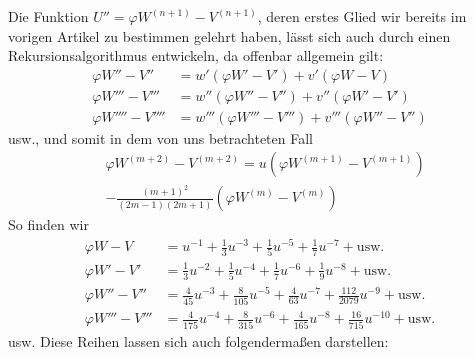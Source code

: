 Die Funktion $U''=\varphi W^{(n+1)}-V^{(n+1)}$, deren erstes Glied wir bereits im vorigen Artikel zu bestimmen gelehrt haben, lässt sich auch durch einen Rekursionsalgorithmus entwickeln, da offenbar allgemein gilt:
\[
\begin{aligned}
\varphi W''-V''&=w'(\varphi W'-V')+v'(\varphi W-V)\\
\varphi W'''-V'''&=w''(\varphi W''-V'')+v''(\varphi W'-V')\\
\varphi W''''-V''''&=w'''(\varphi W'''-V''')+v'''(\varphi W''-V'')
\end{aligned}
\]
usw., und somit in dem von uns betrachteten Fall
\[
\begin{aligned}&\varphi W^{(m+2)}-V^{(m+2)}=u(\varphi W^{(m+1)}-V^{(m+1)})\\[5pt]&-\frac{(m+1)^2}{(2m-1)(2m+1)}(\varphi W^{(m)}-V^{(m)})\end{aligned}
\]
So finden wir
\[
\begin{aligned}
\varphi W-V&=u^{-1}+\tfrac13u^{-3}+\tfrac15u^{-5}+\tfrac17u^{-7}+\text{usw.}\\
\varphi W'-V'&=\tfrac13u^{-2}+\tfrac15u^{-4}+\tfrac17u^{-6}+\tfrac19u^{-8}+\text{usw.}\\
\varphi W''-V''&=\tfrac4{45}u^{-3}+\tfrac8{105}u^{-5}+\tfrac4{63}u^{-7}+\tfrac{112}{2079}u^{-9}+\text{usw.}\\
\varphi W'''-V'''&=\tfrac4{175}u^{-4}+\tfrac8{315}u^{-6}+\tfrac4{165}u^{-8}+\tfrac{16}{715}u^{-10}+\text{usw.}
\end{aligned}
\]
usw. Diese Reihen lassen sich auch folgendermaßen darstellen:
